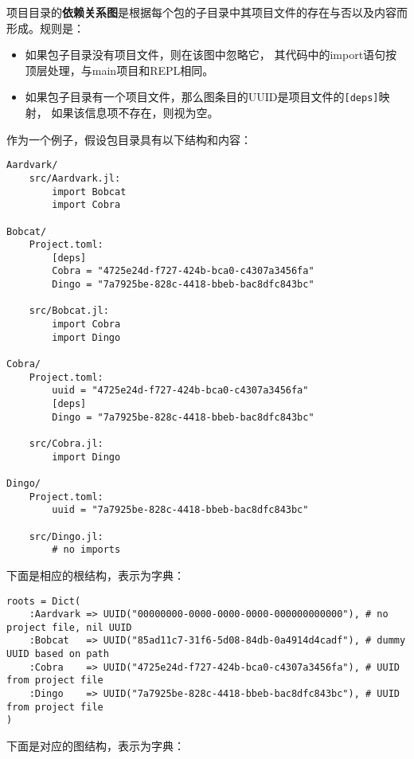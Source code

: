项目目录的\textbf{依赖关系图}是根据每个包的子目录中其项目文件的存在与否以及内容而形成。规则是：



\begin{itemize}
\item 如果包子目录没有项目文件，则在该图中忽略它， 其代码中的import语句按顶层处理，与main项目和REPL相同。


\item 如果包子目录有一个项目文件，那么图条目的UUID是项目文件的\texttt{[deps]}映射， 如果该信息项不存在，则视为空。

\end{itemize}


作为一个例子，假设包目录具有以下结构和内容：




\begin{lstlisting}
Aardvark/
    src/Aardvark.jl:
        import Bobcat
        import Cobra

Bobcat/
    Project.toml:
        [deps]
        Cobra = "4725e24d-f727-424b-bca0-c4307a3456fa"
        Dingo = "7a7925be-828c-4418-bbeb-bac8dfc843bc"

    src/Bobcat.jl:
        import Cobra
        import Dingo

Cobra/
    Project.toml:
        uuid = "4725e24d-f727-424b-bca0-c4307a3456fa"
        [deps]
        Dingo = "7a7925be-828c-4418-bbeb-bac8dfc843bc"

    src/Cobra.jl:
        import Dingo

Dingo/
    Project.toml:
        uuid = "7a7925be-828c-4418-bbeb-bac8dfc843bc"

    src/Dingo.jl:
        # no imports
\end{lstlisting}



下面是相应的根结构，表示为字典：




\begin{verbatim}
roots = Dict(
    :Aardvark => UUID("00000000-0000-0000-0000-000000000000"), # no project file, nil UUID
    :Bobcat   => UUID("85ad11c7-31f6-5d08-84db-0a4914d4cadf"), # dummy UUID based on path
    :Cobra    => UUID("4725e24d-f727-424b-bca0-c4307a3456fa"), # UUID from project file
    :Dingo    => UUID("7a7925be-828c-4418-bbeb-bac8dfc843bc"), # UUID from project file
)
\end{verbatim}



下面是对应的图结构，表示为字典：




